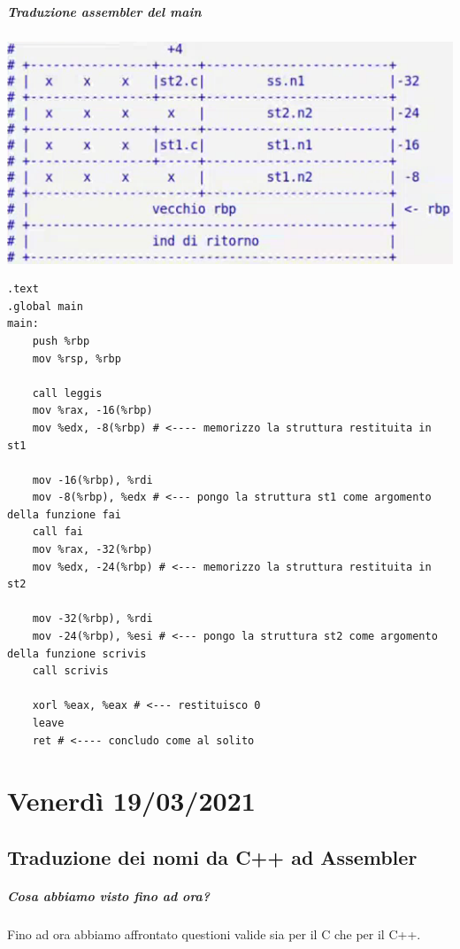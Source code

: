 \documentclass[11pt]{report}
\theoremstyle{definition}
\begin{document}
\paragraph{Traduzione assembler del main}
\begin{center}
\includegraphics{img/37.PNG}
\end{center} 
\begin{verbatim}
.text
.global main
main:
    push %rbp
    mov %rsp, %rbp
          
    call leggis
    mov %rax, -16(%rbp)
    mov %edx, -8(%rbp) # <---- memorizzo la struttura restituita in st1
           
    mov -16(%rbp), %rdi
    mov -8(%rbp), %edx # <--- pongo la struttura st1 come argomento della funzione fai
    call fai
    mov %rax, -32(%rbp)
    mov %edx, -24(%rbp) # <--- memorizzo la struttura restituita in st2
           
    mov -32(%rbp), %rdi
    mov -24(%rbp), %esi # <--- pongo la struttura st2 come argomento della funzione scrivis
    call scrivis
           
    xorl %eax, %eax # <--- restituisco 0
    leave
    ret # <---- concludo come al solito
\end{verbatim}
\endgroup


\chapter{Venerdì 19/03/2021}

\section{Traduzione dei nomi da C++ ad Assembler}
\paragraph{Cosa abbiamo visto fino ad ora?} Fino ad ora abbiamo affrontato questioni valide sia per il C che per il C++.
\end{document}
